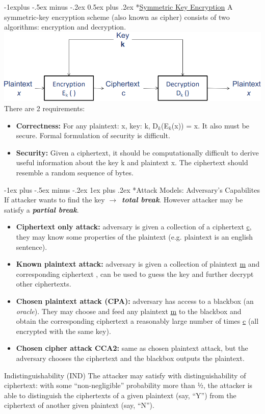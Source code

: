 \documentclass[10pt,landscape]{article}
\makeatletter
\renewcommand{\subsection}{\@startsection{subsection}{2}{0mm}%
                                {-1explus -.5ex minus -.2ex}%
                                {0.5ex plus .2ex}%
                                {\normalfont\normalsize\bfseries}}
\renewcommand{\subsubsection}{\@startsection{subsubsection}{3}{0mm}%
                                {-1ex plus -.5ex minus -.2ex}%
                                {1ex plus .2ex}%
                                {\normalfont\small\bfseries}}
\makeatother
\begin{document}
\begin{multicols*}{3}
\subsection*{\underline{Symmetric Key Encryption}}
A symmetric-key encryption scheme (also known as cipher) consists of two algorithms: encryption and decryption.
\includegraphics[scale=0.5]{images/cipherdiagram.png} 
There are 2 requirements:
\begin{itemize}
    \item \textbf{Correctness:} For any plaintext: x, key: k, D$_k$(E$_k$(x)) = x. It also must be secure. Formal formulation of security is difficult.
    \item \textbf{Security: } Given a ciphertext, it should be computationally difficult to derive useful information about the key k and plaintext x. The ciphertext should resemble a random sequence of bytes.
\end{itemize}

\subsubsection*{Attack Models: Adversary's Capabilites}
If attacker wants to find the key $\rightarrow$\ \textbf{\textit{total break}}. However attacker may be satisfy a \textbf{\textit{partial break}}.
\begin{itemize}
    \item \textbf{Ciphertext only attack:} adversary is given a collection of a ciphertext \underline{c}, they may know some properties of the plaintext (e.g. plaintext is an english sentence).
    \item \textbf{Known plaintext attack:} adversary is given a collection of plaintext \underline{m} and corresponding ciphertext , can be used to guess the key and further decrypt other ciphertexts.
    \item \textbf{Chosen plaintext attack (CPA):} adversary has access to a blackbox (an \textit{oracle}). They may choose and feed any plaintext \underline{m} to the blackbox and obtain the corresponding ciphertext a reasonably large number of times \underline{c} (all encrypted with the same key).
    \item \textbf{Chosen cipher attack CCA2:} same as chosen plaintext attack, but the adversary chooses the ciphertext and the blackbox outputs the plaintext. 
\end{itemize}
Indistinguishability (IND) The attacker may satisfy with distinguishability of ciphertext:
with some “non-negligible” probability more than ½, the attacker is able to distinguish
the ciphertexts of a given plaintext (say, “Y”) from the ciphertext of another given
plaintext (say, “N”).


\end{multicols*}
\end{document}
